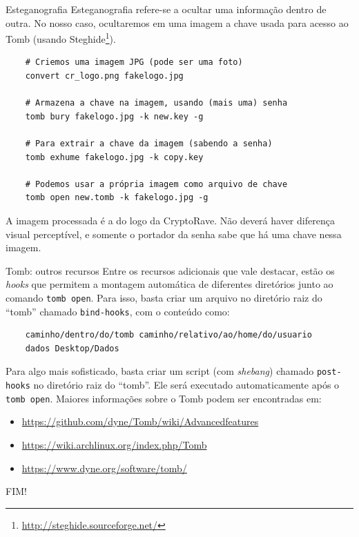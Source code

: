 \documentclass[utf8]{beamer}
\begin{document}
\begin{frame}[fragile]{Esteganografia}
  Esteganografia refere-se a ocultar uma informação dentro de outra.
  No nosso caso, ocultaremos em uma imagem a chave usada
  para acesso ao Tomb (usando Steghide\footnote{
    \url{http://steghide.sourceforge.net/}
  }).
  \vfill
  \begin{verbatim}
    # Criemos uma imagem JPG (pode ser uma foto)
    convert cr_logo.png fakelogo.jpg

    # Armazena a chave na imagem, usando (mais uma) senha
    tomb bury fakelogo.jpg -k new.key -g

    # Para extrair a chave da imagem (sabendo a senha)
    tomb exhume fakelogo.jpg -k copy.key

    # Podemos usar a própria imagem como arquivo de chave
    tomb open new.tomb -k fakelogo.jpg -g
  \end{verbatim}
  \vfill
  A imagem processada é a do logo da CryptoRave.
  Não deverá haver diferença visual perceptível,
  e somente o portador da senha sabe que há uma chave nessa imagem.
\end{frame}


\begin{frame}[fragile]{Tomb: outros recursos}
  Entre os recursos adicionais que vale destacar,
  estão os \emph{hooks} que permitem a montagem automática
  de diferentes diretórios junto ao comando \texttt{tomb open}.
  Para isso, basta criar um arquivo no diretório raiz do ``tomb''
  chamado \texttt{bind-hooks}, com o conteúdo como:
  \begin{verbatim}
    caminho/dentro/do/tomb caminho/relativo/ao/home/do/usuario
    dados Desktop/Dados
  \end{verbatim}
  Para algo mais sofisticado,
  basta criar um script (com \emph{shebang})
  chamado \texttt{post-hooks}
  no diretório raiz do ``tomb''.
  Ele será executado automaticamente após o \texttt{tomb open}.
  \vfill
  Maiores informações sobre o Tomb podem ser encontradas em:
  \begin{itemize}
    \item \url{https://github.com/dyne/Tomb/wiki/Advancedfeatures}
    \item \url{https://wiki.archlinux.org/index.php/Tomb}
    \item \url{https://www.dyne.org/software/tomb/}
  \end{itemize}
\end{frame}


\begin{frame}
  \begin{center}\fontsize{5cm}{2.5cm}\selectfont
    FIM!
  \end{center}
\end{frame}
\end{document}
